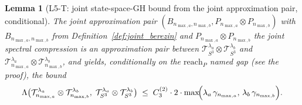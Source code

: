 \documentclass[11pt,a4paper]{article}
\theoremstyle{plain}
\newtheorem{lemma}[theorem]{Lemma}
\theoremstyle{definition}
\newcommand{\nmaxa}{n_{\max,a}}
\newcommand{\nmaxb}{n_{\max,b}}
\newcommand{\sthree}{S^{3}}
\newcommand{\Tcal}{\mathcal{T}}
\begin{document}
\begin{lemma}[L5-T: joint state-space-GH bound from the joint
approximation pair, conditional]\label{lem:L5-T}
The joint approximation pair $(B_{\nmaxa, \nmaxb}, P_{\nmaxa} \otimes
P_{\nmaxb})$ with $B_{\nmaxa, \nmaxb}$ from
Definition~\ref{def:joint_berezin} and $P_{\nmaxa} \otimes P_{\nmaxb}$
the joint spectral compression is an approximation pair
between $\Tcal_{\sthree}^{\lambda_a} \otimes \Tcal_{\sthree}^{\lambda_b}$
and $\Tcal_{\nmaxa}^{\lambda_a} \otimes \Tcal_{\nmaxb}^{\lambda_b}$, and
yields, \emph{conditionally on the $\mathrm{reach}_P$ named gap} (see the
proof), the bound
\begin{equation}\label{eq:L5_bound_T}
   \Lambda\bigl(\Tcal_{\nmaxa}^{\lambda_a} \otimes
                \Tcal_{\nmaxb}^{\lambda_b},\;
                \Tcal_{\sthree}^{\lambda_a} \otimes
                \Tcal_{\sthree}^{\lambda_b}\bigr)
   \;\le\; C_3^{(2)} \cdot 2 \cdot
            \max\!\Bigl(\lambda_a\,\gamma_{\nmaxa},\,
                        \lambda_b\,\gamma_{\nmaxb}\Bigr).
\end{equation}
\end{lemma}
\end{document}

